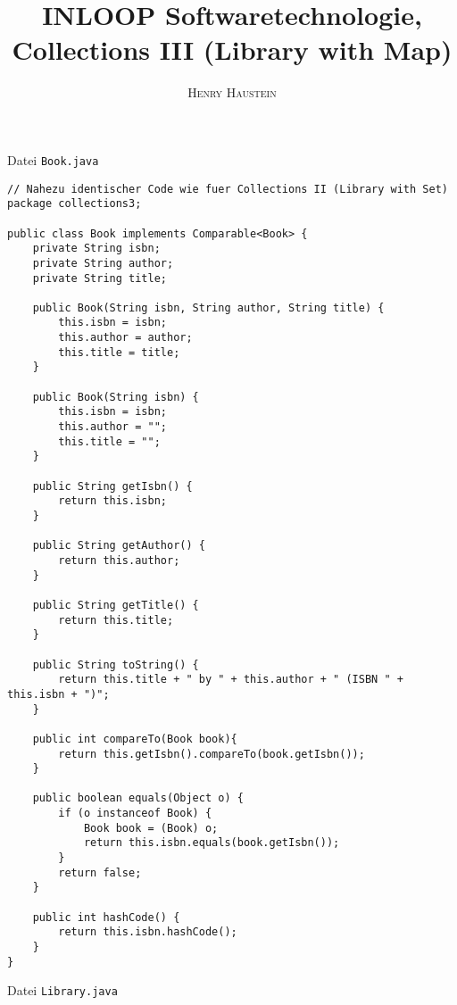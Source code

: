 \documentclass{article}
\title{\textbf{INLOOP Softwaretechnologie, Collections III (Library with Map)}}
\author{\textsc{Henry Haustein}}
\date{}
\begin{document}
	\maketitle
	
	Datei \texttt{Book.java}
	\begin{lstlisting}[style=java,tabsize=2]
// Nahezu identischer Code wie fuer Collections II (Library with Set)
package collections3;

public class Book implements Comparable<Book> {
	private String isbn;
	private String author;
	private String title;

	public Book(String isbn, String author, String title) {
		this.isbn = isbn;
		this.author = author;
		this.title = title;
	}

	public Book(String isbn) {
		this.isbn = isbn;
		this.author = "";
		this.title = "";
	}

	public String getIsbn() {
		return this.isbn;
	}

	public String getAuthor() {
		return this.author;
	}

	public String getTitle() {
		return this.title;
	}

	public String toString() {
		return this.title + " by " + this.author + " (ISBN " + this.isbn + ")";
	}

	public int compareTo(Book book){
		return this.getIsbn().compareTo(book.getIsbn());
	}

	public boolean equals(Object o) {
		if (o instanceof Book) {
			Book book = (Book) o;
			return this.isbn.equals(book.getIsbn());
		}
		return false;
	}

	public int hashCode() {
		return this.isbn.hashCode();
	}
}
	\end{lstlisting}
	Datei \texttt{Library.java}
\end{document}

